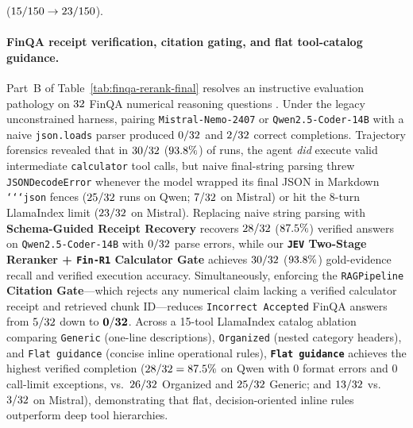 ($15/150 \rightarrow 23/150$).

\paragraph{FinQA receipt verification, citation gating, and flat tool-catalog guidance.}
Part~B of Table~\ref{tab:finqa-rerank-final} resolves an instructive evaluation pathology on $32$ FinQA numerical reasoning questions \citep{chen2021finqa}. Under the legacy unconstrained harness, pairing \texttt{Mistral-Nemo-2407} or \texttt{Qwen2.5-Coder-14B} with a naive \texttt{json.loads} parser produced $0/32$ and $2/32$ correct completions. Trajectory forensics revealed that in $30/32$ ($93.8\%$) of runs, the agent \emph{did} execute valid intermediate \texttt{calculator} tool calls, but naive final-string parsing threw \texttt{JSONDecodeError} whenever the model wrapped its final JSON in Markdown \texttt{`{}`{}`{}json} fences ($25/32$ runs on Qwen; $7/32$ on Mistral) or hit the 8-turn LlamaIndex limit ($23/32$ on Mistral). Replacing naive string parsing with \textbf{Schema-Guided Receipt Recovery} recovers $28/32$ ($87.5\%$) verified answers on \texttt{Qwen2.5-Coder-14B} with $0/32$ parse errors, while our \textbf{\texttt{JEV} Two-Stage Reranker + \texttt{Fin-R1} Calculator Gate} achieves $30/32$ ($93.8\%$) gold-evidence recall and verified execution accuracy. Simultaneously, enforcing the \texttt{RAGPipeline} \textbf{Citation Gate}---which rejects any numerical claim lacking a verified calculator receipt and retrieved chunk ID---reduces \texttt{Incorrect Accepted} FinQA answers from $5/32$ down to $\mathbf{0/32}$. Across a 15-tool LlamaIndex catalog ablation comparing \texttt{Generic} (one-line descriptions), \texttt{Organized} (nested category headers), and \texttt{Flat guidance} (concise inline operational rules), \textbf{\texttt{Flat guidance}} achieves the highest verified completion ($28/32 = 87.5\%$ on Qwen with $0$ format errors and $0$ call-limit exceptions, vs.\ $26/32$ Organized and $25/32$ Generic; and $13/32$ vs.\ $3/32$ on Mistral), demonstrating that flat, decision-oriented inline rules outperform deep tool hierarchies.

